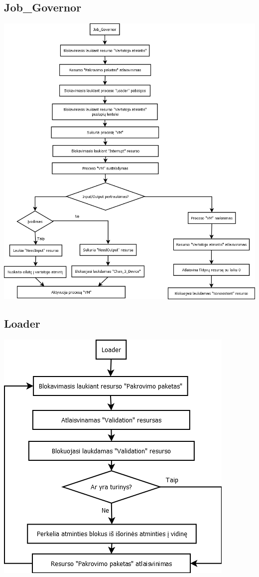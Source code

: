 	\subsection{Job\_Governor}
		\begin{center}
			\includegraphics[scale=0.6]{diagramos/jobGovernor.png}
		\end{center}
	\subsection{Loader}
		\begin{center}
			\includegraphics[scale=0.9]{diagramos/loader.png}
		\end{center}
